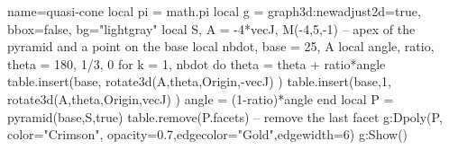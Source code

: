 \documentclass[border=5pt]{standalone}%
\begin{document}
\begin{luadraw}{name=quasi-cone}
local pi = math.pi
local g = graph3d:new{adjust2d=true, bbox=false, bg="lightgray"}
local S, A = -4*vecJ, M(-4,5,-1) -- apex of the pyramid and a point on the base
local nbdot, base = 25, {A}
local angle, ratio, theta = 180, 1/3, 0
for k = 1, nbdot do
    theta = theta + ratio*angle
    table.insert(base, rotate3d(A,theta,{Origin,-vecJ}) )
    table.insert(base,1, rotate3d(A,theta,{Origin,vecJ}) )
    angle = (1-ratio)*angle
end
local P = pyramid(base,S,true)
table.remove(P.facets) -- remove the last facet
g:Dpoly(P, {color="Crimson", opacity=0.7,edgecolor="Gold",edgewidth=6})
g:Show()
\end{luadraw}
\end{document}
